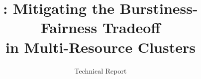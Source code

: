 \documentclass[preprint]{sig-alternate-10pt} %
\begin{document}




\title{\name: Mitigating the Burstiness-Fairness Tradeoff\\ in Multi-Resource Clusters}
\subtitle{Technical Report}


\maketitle

%

%

\begin{abstract}

\end{abstract}








% 















%

%


{
 

}
\end{document}
